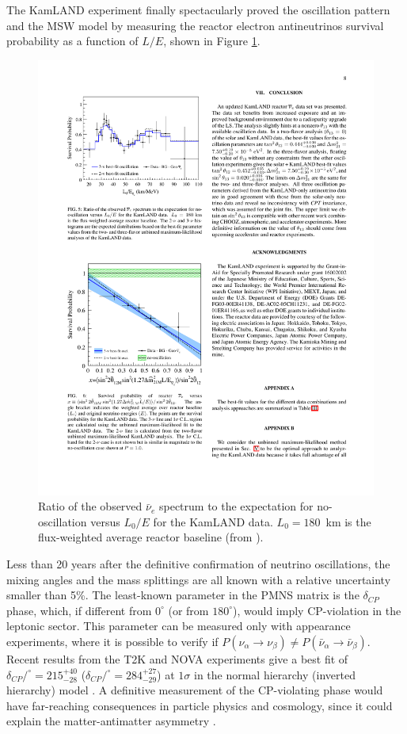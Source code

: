 \vspace{1em}

The KamLAND experiment finally spectacularly proved the oscillation pattern and the MSW model by measuring the reactor electron antineutrinos survival probability as a function of $L/E$, shown in Figure \ref{fig:kamland}. 

\begin{figure}[htbp]
    \centering
    \includegraphics[width=0.75\linewidth]{figures/kamland.pdf}
    \caption{Ratio of the observed $\bar{\nu}_{e}$ spectrum to the expectation for no-oscillation versus $L_{0}/E$ for the KamLAND data. $L_{0} = 180$~km is the flux-weighted average reactor baseline (from \cite{Gando:2010aa}).}
    \label{fig:kamland}
\end{figure}

Less than 20 years after the definitive confirmation of neutrino oscillations, the mixing angles and the mass splittings are all known with a relative uncertainty smaller than 5\%. The least-known parameter in the PMNS matrix is the $\delta_{CP}$ phase, which, if different from $0^{\circ}$ (or from $180^{\circ}$), would imply CP-violation in the leptonic sector. This parameter can be measured only with appearance experiments, where it is possible to verify if
$P(\nu_{\alpha}\rightarrow\nu_{\beta}) \neq P(\bar{\nu}_{\alpha}\rightarrow\bar{\nu}_{\beta})$. Recent results from the T2K and NOVA experiments give a best fit of $\delta_{CP}/^{\circ}=215^{+40}_{-28}$  ($\delta_{CP}/^{\circ}=284^{+27}_{-29}$) at $1\sigma$ in the normal hierarchy (inverted hierarchy) model \cite{Esteban:2018azc}. A definitive measurement of the CP-violating phase would have far-reaching consequences in particle physics and cosmology, since it could explain the matter-antimatter asymmetry \cite{Fukugita:1986hr}.

